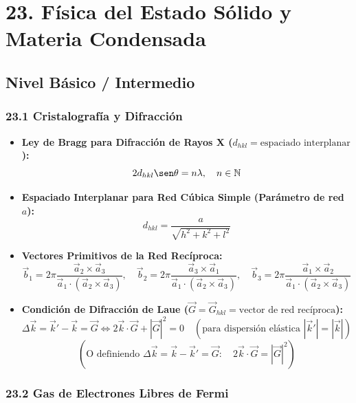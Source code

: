 \documentclass[11pt,a4paper]{article}
\begin{document}
\section*{23. Física del Estado Sólido y Materia Condensada}

\subsection*{Nivel Básico / Intermedio}

\subsubsection*{23.1 Cristalografía y Difracción}

\begin{itemize}
  \item \textbf{Ley de Bragg para Difracción de Rayos X ($d_{hkl} = \text{espaciado interplanar}$):}
  \[
    2 d_{hkl} \sen\theta = n \lambda, \quad n \in \mathbb{N}
  \]
  \item \textbf{Espaciado Interplanar para Red Cúbica Simple (Parámetro de red $a$):}
  \[
    d_{hkl} = \frac{a}{\sqrt{h^2 + k^2 + l^2}}
  \]
  \item \textbf{Vectores Primitivos de la Red Recíproca:}
  \[
    \vec{b}_1 = 2\pi \frac{\vec{a}_2 \times \vec{a}_3}{\vec{a}_1 \cdot (\vec{a}_2 \times \vec{a}_3)}, \quad \vec{b}_2 = 2\pi \frac{\vec{a}_3 \times \vec{a}_1}{\vec{a}_1 \cdot (\vec{a}_2 \times \vec{a}_3)}, \quad \vec{b}_3 = 2\pi \frac{\vec{a}_1 \times \vec{a}_2}{\vec{a}_1 \cdot (\vec{a}_2 \times \vec{a}_3)}
  \]
  \item \textbf{Condición de Difracción de Laue ($\vec{G} = \vec{G}_{hkl} = \text{vector de red recíproca}$):}
  \[
    \Delta\vec{k} = \vec{k}' - \vec{k} = \vec{G} \iff 2\vec{k} \cdot \vec{G} + |\vec{G}|^2 = 0 \quad (\text{para dispersión elástica } |\vec{k}'| = |\vec{k}|)
  \]
  \[
    \left( \text{O definiendo } \Delta\vec{k} = \vec{k} - \vec{k}' = \vec{G}: \quad 2\vec{k} \cdot \vec{G} = |\vec{G}|^2 \right)
  \]
\end{itemize}

\subsubsection*{23.2 Gas de Electrones Libres de Fermi}
\end{document}
